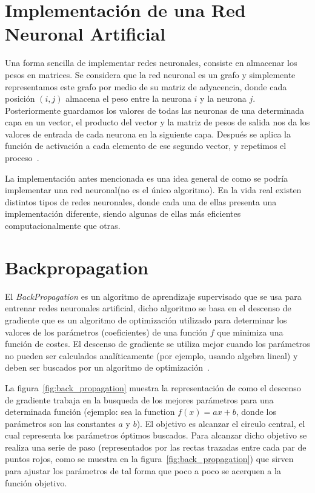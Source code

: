 \section{Implementación de una Red Neuronal Artificial}
Una forma sencilla de implementar redes neuronales, consiste en almacenar los pesos en matrices. Se considera que la red neuronal es un grafo y simplemente representamos este grafo por medio de su matriz de adyacencia, donde cada posición $(i,j)$ almacena el peso entre la neurona $i$ y la neurona $j$. Posteriormente guardamos los valores de todas las neuronas de una determinada capa en un vector, el producto del vector y la matriz de pesos de salida nos da los valores de entrada de cada neurona en la siguiente capa. Después se aplica la función de activación a cada elemento de ese segundo vector, y repetimos el proceso~\cite{21RedesNeuronales}.

La implementación antes mencionada es una idea general de como se podría implementar una red neuronal(no es el único algoritmo). En la vida real existen distintos tipos de redes neuronales, donde cada una de ellas presenta una implementación diferente, siendo algunas de ellas más eficientes computacionalmente que otras.

\section{Backpropagation}
\label{sub:backpropagation}
El \textit{BackPropagation} es un algoritmo de aprendizaje supervisado que se usa para entrenar redes neuronales artificial, dicho algoritmo se basa en el descenso de gradiente que es un algoritmo de optimización utilizado para determinar los valores de los parámetros (coeficientes) de una función $f$ que minimiza una función de costes. El descenso de gradiente se utiliza mejor cuando los parámetros no pueden ser calculados analíticamente (por ejemplo, usando algebra lineal) y deben ser buscados por un algoritmo de optimización~\cite{27lehr1993backpropagation}.

La figura~\ref{fig:back_propagation} muestra la representación de como el descenso de gradiente trabaja en la busqueda de los mejores parámetros para una determinada función (ejemplo: sea la function $f(x)=ax+b$, donde los parámetros son las constantes $a$ y $b$). El objetivo es alcanzar el circulo central, el cual representa los parámetros óptimos buscados. Para alcanzar dicho objetivo se realiza una serie de paso (representados por las rectas trazadas entre cada par de puntos rojos, como se muestra en la figura~\ref{fig:back_propagation}) que sirven para ajustar los parámetros de tal forma que poco a poco se acerquen a la función objetivo.

